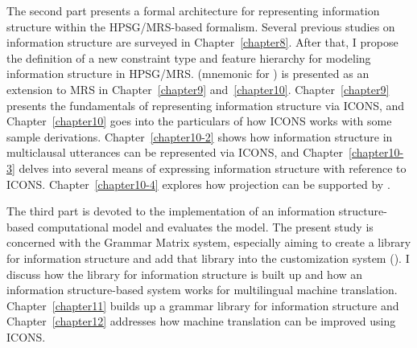 The second part presents a formal architecture for representing
information structure within the HPSG/MRS-based formalism.  Several
previous studies on information structure are surveyed in
Chapter~\ref{chapter8}.  After that, I propose the definition of a new
constraint type and feature hierarchy for modeling information
structure in HPSG/MRS.  (mnemonic for ) is presented as an extension to MRS in
Chapter~\ref{chapter9} and~\ref{chapter10}.  Chapter~\ref{chapter9}
presents the fundamentals of representing information structure via
ICONS, and Chapter~\ref{chapter10} goes into the particulars of how
ICONS works with some sample derivations.  Chapter~\ref{chapter10-2}
shows how information structure in multiclausal utterances can be
represented via ICONS, and Chapter~\ref{chapter10-3} delves into
several means of expressing information structure with reference to
ICONS.  Chapter~\ref{chapter10-4} explores how  projection can be
supported by .


The third part is devoted to the implementation of an information
structure-based computational model and evaluates the model.  The
present study is concerned with the \lingo Grammar Matrix system,
especially aiming to create a library for information structure and
add that library into the customization system
(\citealt{bender:flickinger:05,drellishak:09,bender:etal:10}). I
discuss how the library for information structure is built up and how
an information structure-based system works for multilingual machine
translation.  Chapter~\ref{chapter11} builds up a grammar library for
information structure and Chapter~\ref{chapter12} addresses how
machine translation can be improved using ICONS.


